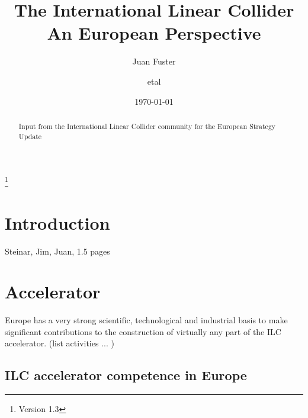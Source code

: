 \documentclass[%
 reprint,
 amsmath,amssymb,
 aps,
]{revtex4-1}
\begin{document}

\title{The International Linear Collider\\ An European Perspective}%
\thanks{Version 1.3}%

\author{Juan Fuster}
\author{etal}%
%


\date{\today}%

\begin{abstract}
Input from the International Linear Collider community for the European Strategy Update

\end{abstract}

\maketitle


\section{\label{sec:intro}Introduction}

Steinar, Jim, Juan, 1.5 pages

\section{\label{sec:acc}Accelerator}

Europe has a very strong scientific, technological and industrial basis
to make significant contributions to the construction of virtually any part of the ILC accelerator. 
(list activities ... )

\subsection{ILC accelerator competence in Europe~\label{sec:competence:accelerator}}
\end{document}

